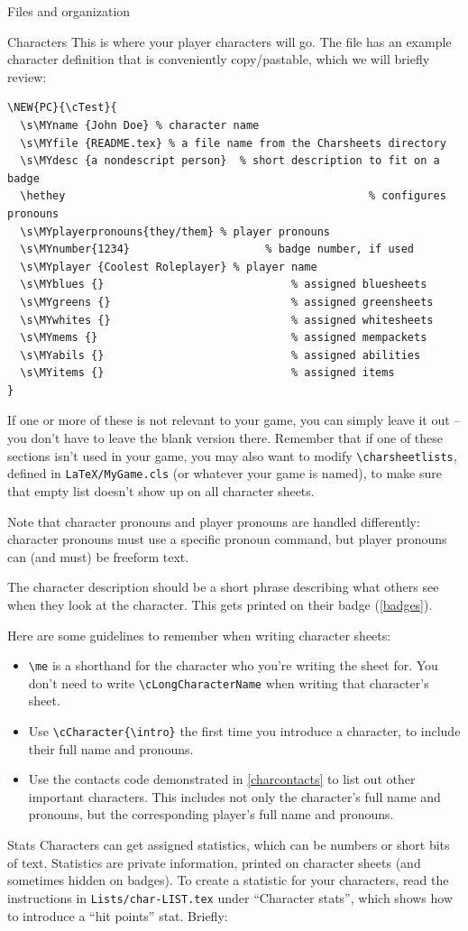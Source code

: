 \documentclass[sheet]{GameTexBase}
\begin{document}
\begin{section}{Files and organization}
\begin{subsection}{Characters}
This is where your player characters will go.  The file has an example character definition that is conveniently copy/pastable, which we will briefly review:
\begin{verbatim}
\NEW{PC}{\cTest}{
  \s\MYname	{John Doe} % character name
  \s\MYfile {README.tex} % a file name from the Charsheets directory
  \s\MYdesc	{a nondescript person}  % short description to fit on a badge
  \hethey												% configures pronouns
  \s\MYplayerpronouns{they/them} % player pronouns
  \s\MYnumber{1234}						% badge number, if used
  \s\MYplayer {Coolest Roleplayer} % player name
  \s\MYblues {}								% assigned bluesheets
  \s\MYgreens {}							% assigned greensheets
  \s\MYwhites {}							% assigned whitesheets
  \s\MYmems {}								% assigned mempackets
  \s\MYabils {}								% assigned abilities
  \s\MYitems {}								% assigned items
}
\end{verbatim}
If one or more of these is not relevant to your game, you can simply leave it out -- you don't have to leave the blank version there.  Remember that if one of these sections isn't used in your game, you may also want to modify \lstinline|\charsheetlists|, defined in \lstinline|LaTeX/MyGame.cls| (or whatever your game is named), to make sure that empty list doesn't show up on all character sheets.

Note that character pronouns and player pronouns are handled differently: character pronouns must use a specific pronoun command, but player pronouns can (and must) be freeform text.

The character description should be a short phrase describing what others see when they look at the character.  This gets printed on their badge (\ref{badges}).

Here are some guidelines to remember when writing character sheets:
\begin{itemize}
\item \lstinline|\me| is a shorthand for the character who you're writing the sheet for.  You don't need to write \lstinline|\cLongCharacterName| when writing that character's sheet.
\item Use \lstinline|\cCharacter{\intro}| the first time you introduce a character, to include their full name and pronouns.
\item Use the contacts code demonstrated in \ref{charcontacts} to list out other important characters.  This includes not only the character's full name and pronouns, but the corresponding player's full name and pronouns.
\end{itemize}
\begin{subsubsection}{Stats}
\label{charstats}
Characters can get assigned statistics, which can be numbers or short bits of text.  Statistics are private information, printed on character sheets (and sometimes hidden on badges).  To create a statistic for your characters, read the instructions in \lstinline|Lists/char-LIST.tex| under ``Character stats'', which shows how to introduce a ``hit points'' stat.  Briefly:


\end{subsubsection}
\end{subsection}
\end{section}
\end{document}
